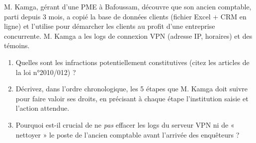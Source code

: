 \documentclass[11pt]{article}
\begin{document}
\begin{exercice}
M. Kamga, gérant d'une PME à Bafoussam, découvre que son ancien comptable, parti depuis 3 mois, a copié la base de données clients (fichier Excel + CRM en ligne) et l'utilise pour démarcher les clients au profit d'une entreprise concurrente. M. Kamga a les logs de connexion VPN (adresse IP, horaires) et des témoins.

\begin{enumerate}
    \item Quelles sont les infractions potentiellement constitutives (citez les articles de la loi n°2010/012) ?
    \item Décrivez, dans l'ordre chronologique, les 5 étapes que M. Kamga doit suivre pour faire valoir ses droits, en précisant à chaque étape l'institution saisie et l'action attendue.
    \item Pourquoi est-il crucial de ne \emph{pas} effacer les logs du serveur VPN ni de « nettoyer » le poste de l'ancien comptable avant l'arrivée des enquêteurs ?
\end{enumerate}
\end{exercice}
\end{document}
